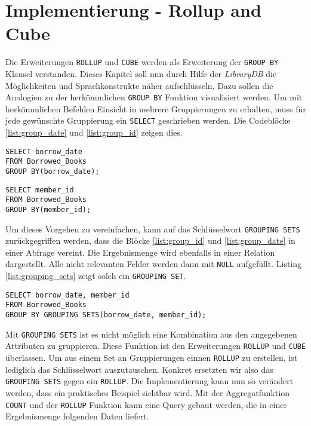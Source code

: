 \section{Implementierung - Rollup and Cube}
\label{sec:implementierung_rollup_and_cube} Die Erweiterungen \texttt{ROLLUP} und
\texttt{CUBE} werden als Erweiterung der \texttt{GROUP BY} Klausel verstanden.
Dieses Kapitel soll nun durch Hilfe der \textit{LibraryDB} die Möglichkeiten und
Sprachkonstrukte näher aufschlüsseln. Dazu sollen die Analogien zu der
herkömmlichen \texttt{GROUP BY} Funktion visualisiert werden. Um mit
herkömmlichen Befehlen Einsicht in mehrere Gruppierungen zu erhalten, muss für jede
gewünschte Gruppierung ein \texttt{SELECT} geschrieben werden. Die Codeblöcke \ref{list:group_date}
und \ref{list:group_id} zeigen dies.

\begin{minipage}{0.45\textwidth}
	 \begin{lstlisting}
SELECT borrow_date
FROM Borrowed_Books
GROUP BY(borrow_date);
	\end{lstlisting}
\end{minipage}
\hfill
\begin{minipage}{0.45\textwidth}
	 \begin{lstlisting}
SELECT member_id
FROM Borrowed_Books
GROUP BY(member_id);
	\end{lstlisting}
\end{minipage}

Um dieses Vorgehen zu vereinfachen, kann auf das Schlüsselwort \texttt{GROUPING
SETS} zurückgegriffen werden, dass die Blöcke \ref{list:group_id} und \ref{list:group_date}
in einer Abfrage vereint. Die Ergebnismenge wird ebenfalls in einer Relation
dargestellt. Alle nicht relevanten Felder werden dann mit \texttt{NULL}
aufgefüllt. Listing \ref{list:grouping_sets} zeigt solch ein \texttt{GROUPING
SET}.

\begin{lstlisting}[caption={Beispiel eines \texttt{GROUPING SETS}}, label={list:grouping_sets}]
SELECT borrow_date, member_id
FROM Borrowed_Books
GROUP BY GROUPING SETS(borrow_date, member_id);
\end{lstlisting}

Mit \texttt{GROUPING SETS} ist es nicht möglich eine Kombination aus den
angegebenen Attributen zu gruppieren. Diese Funktion ist den Erweiterungen \texttt{ROLLUP}
und \texttt{CUBE} überlassen. Um aus einem Set an Gruppierungen einnen \texttt{ROLLUP}
zu erstellen, ist lediglich das Schlüsselwort auszutauschen. Konkret ersetzten wir
also das \texttt{GROUPING SETS} gegen ein \texttt{ROLLUP}. Die Implementierung
kann nun so verändert werden, dass ein praktisches Beispiel sichtbar wird. Mit
der Aggregatfunktion \texttt{COUNT} und der \texttt{ROLLUP} Funktion kann eine
Query gebaut werden, die in einer Ergebnismenge folgenden Daten liefert.

